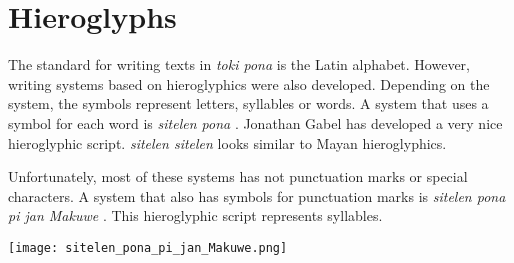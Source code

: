 \section{Hieroglyphs}
%

The standard for writing texts in \textit{toki pona} is the Latin alphabet. 
However, writing systems based on hieroglyphics were also developed. 
Depending on the system, the symbols represent letters, syllables or words. 
A system that uses a symbol for each word is \textit{sitelen pona} \cite{www:tokipona.org:02}. 
Jonathan Gabel has developed a very nice hieroglyphic script. 
\textit{sitelen sitelen} \cite{www:jonathangabel.com:01} looks similar to Mayan hieroglyphics.


Unfortunately, most of these systems has not punctuation marks or special characters. 
A system that also has symbols for punctuation marks is \textit{sitelen pona pi jan Makuwe} \cite{www:janMakuwe:01}.
This hieroglyphic script represents syllables. 


\texttt{[image: sitelen\_pona\_pi\_jan\_Makuwe.png]}

% 
